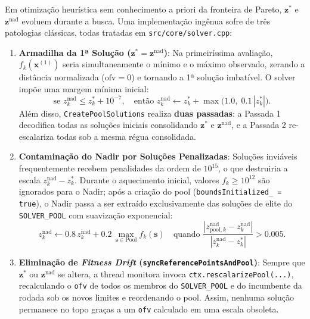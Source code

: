 \documentclass[11pt,a4paper]{article}
\begin{document}
Em otimização heurística sem conhecimento a priori da fronteira de Pareto, $\mathbf{z}^*$ e $\mathbf{z}^{\text{nad}}$ evoluem durante a busca. Uma implementação ingênua sofre de três patologias clássicas, todas tratadas em \texttt{src/core/solver.cpp}:
\begin{enumerate}[leftmargin=*]
  \item \textbf{Armadilha da 1ª Solução ($\mathbf{z}^* = \mathbf{z}^{\text{nad}}$)}: Na primeiríssima avaliação, $f_k(\mathbf{x}^{(1)})$ seria simultaneamente o mínimo e o máximo observado, zerando a distância normalizada ($\text{ofv} = 0$) e tornando a 1ª solução imbatível. O solver impõe uma margem mínima inicial:
  \begin{equation}
    \text{se } z^{\text{nad}}_k \le z^*_k + 10^{-7}, \quad \text{então } z^{\text{nad}}_k \leftarrow z^*_k + \max\!\big(1.0,\; 0.1\,|z^*_k|\big).
  \end{equation}
  Além disso, \texttt{CreatePoolSolutions} realiza \textbf{duas passadas}: a Passada 1 decodifica todas as soluções iniciais consolidando $\mathbf{z}^*$ e $\mathbf{z}^{\text{nad}}$, e a Passada 2 re-escalariza todas sob a mesma régua consolidada.
  \item \textbf{Contaminação do Nadir por Soluções Penalizadas}: Soluções inviáveis frequentemente recebem penalidades da ordem de $10^{15}$, o que destruiria a escala $z^{\text{nad}}_k - z^*_k$. Durante o aquecimento inicial, valores $f_k \ge 10^{12}$ são ignorados para o Nadir; após a criação do pool (\texttt{boundsInitialized\_ = true}), o Nadir passa a ser extraído exclusivamente das soluções de elite do \texttt{SOLVER\_POOL} com suavização exponencial:
  \begin{equation}
    z^{\text{nad}}_k \leftarrow 0.8\, z^{\text{nad}}_k + 0.2\, \max_{\mathbf{s} \in \text{Pool}} f_k(\mathbf{s})
    \quad \text{quando } \frac{|z^{\text{nad}}_{\text{pool},k} - z^{\text{nad}}_k|}{|z^{\text{nad}}_k - z^*_k|} > 0.005.
  \end{equation}
  \item \textbf{Eliminação de \emph{Fitness Drift} (\texttt{syncReferencePointsAndPool})}: Sempre que $\mathbf{z}^*$ ou $\mathbf{z}^{\text{nad}}$ se altera, a thread monitora invoca \texttt{ctx.rescalarizePool(...)}, recalculando o \texttt{ofv} de todos os membros do \texttt{SOLVER\_POOL} e do incumbente da rodada sob os novos limites e reordenando o pool. Assim, nenhuma solução permanece no topo graças a um \texttt{ofv} calculado em uma escala obsoleta.
\end{enumerate}
\end{document}
